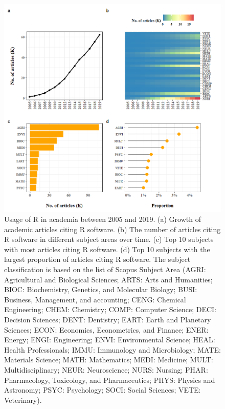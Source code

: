 \begin{Schunk}
\begin{figure}
\includegraphics[width=1\linewidth,height=0.3\textheight]{fig4} \caption[Usage of R in academia between 2005 and 2019]{Usage of R in academia between 2005 and 2019. (a) Growth of academic articles citing R software. (b) The number of articles citing R software in different subject areas over time. (c) Top 10 subjects with most articles citing R software. (d) Top 10 subjects with the largest proportion of articles citing R software. The subject classification is based on the list of Scopus Subject Area (AGRI: Agricultural and Biological Sciences; ARTS: Arts and Humanities; BIOC: Biochemistry, Genetics, and Molecular Biology; BUSI: Business, Management, and accounting; CENG: Chemical Engineering; CHEM: Chemistry; COMP: Computer Science; DECI: Decision Sciences; DENT: Dentistry; EART: Earth and Planetary Sciences; ECON: Economics, Econometrics, and Finance; ENER: Energy; ENGI: Engineering; ENVI: Environmental Science; HEAL: Health Professionals; IMMU: Immunology and Microbiology; MATE: Materials Science; MATH: Mathematics; MEDI: Medicine; MULT: Multidisciplinary; NEUR: Neuroscience; NURS: Nursing; PHAR: Pharmacology, Toxicology, and Pharmaceutics; PHYS: Physics and Astronomy; PSYC: Psychology; SOCI: Social Sciences; VETE: Veterinary). }\label{fig:fig4}
\end{figure}
\end{Schunk}

